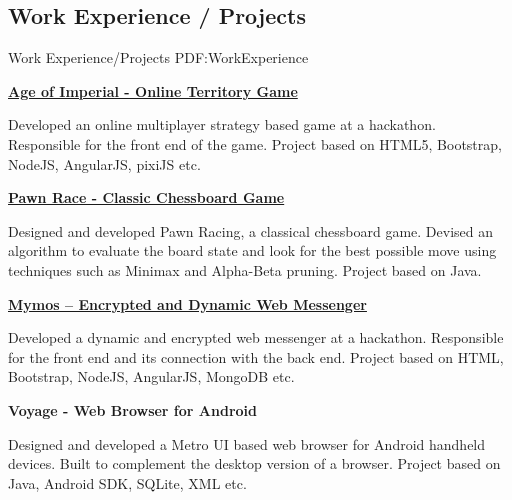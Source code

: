 \documentclass[letterpaper,10pt,oneside]{article}
\begin{document}
\begin{body}

\section
{Work Experience / Projects}
{Work Experience/Projects}
{PDF:WorkExperience}

\BulletItem
\href{https://github.com/SomeRandomTeam/hackatbrookes2016}{\textbf{Age of Imperial - Online Territory Game}}
\hfill
{}
\begin{detail}
\GapNoBreak
\SubBulletItem
Developed an online multiplayer strategy based game at a hackathon.
\SubBulletItem
Responsible for the front end of the game.
\SubBulletItem
Project based on HTML5, Bootstrap, NodeJS, AngularJS, pixiJS etc.
\end{detail}

\GapNoBreak

\BulletItem
\href{https://github.com/mishrabhinav/javachess-pawnrace}{\textbf{Pawn Race - Classic Chessboard Game}}
\hfill
{}
\begin{detail}
\GapNoBreak
\SubBulletItem
Designed and developed Pawn Racing, a classical chessboard game.
\SubBulletItem
Devised an algorithm to evaluate the board state and look for the best possible move using techniques such as Minimax and Alpha-Beta pruning.
\SubBulletItem
Project based on Java.
\end{detail}

\GapNoBreak

\BulletItem
\href{https://github.com/SomeRandomTeam/hackkings2015}{\textbf{Mymos – Encrypted and Dynamic Web Messenger}}
\hfill
{}
\begin{detail}
\GapNoBreak
\SubBulletItem
Developed a dynamic and encrypted web messenger at a hackathon.
\SubBulletItem
Responsible for the front end and its connection with the back end.
\SubBulletItem
Project based on HTML, Bootstrap, NodeJS, AngularJS, MongoDB etc.
\end{detail}

\GapNoBreak

\BulletItem
\textbf{Voyage - Web Browser for Android}
\hfill
{}
\begin{detail}
\GapNoBreak
\SubBulletItem
Designed and developed a Metro UI based web browser for Android handheld devices.
\SubBulletItem
Built to complement the desktop version of a browser.
\SubBulletItem
Project based on Java, Android SDK, SQLite, XML etc.
\end{detail}


\end{body}
\end{document}
